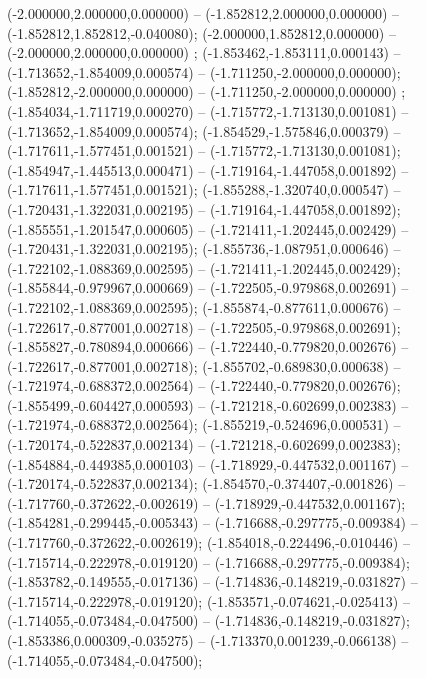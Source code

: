  (-2.000000,2.000000,0.000000) -- (-1.852812,2.000000,0.000000) -- (-1.852812,1.852812,-0.040080);
 (-2.000000,1.852812,0.000000) -- (-2.000000,2.000000,0.000000) ;
 (-1.853462,-1.853111,0.000143) -- (-1.713652,-1.854009,0.000574) -- (-1.711250,-2.000000,0.000000);
 (-1.852812,-2.000000,0.000000) -- (-1.711250,-2.000000,0.000000) ;
 (-1.854034,-1.711719,0.000270) -- (-1.715772,-1.713130,0.001081) -- (-1.713652,-1.854009,0.000574);
 (-1.854529,-1.575846,0.000379) -- (-1.717611,-1.577451,0.001521) -- (-1.715772,-1.713130,0.001081);
 (-1.854947,-1.445513,0.000471) -- (-1.719164,-1.447058,0.001892) -- (-1.717611,-1.577451,0.001521);
 (-1.855288,-1.320740,0.000547) -- (-1.720431,-1.322031,0.002195) -- (-1.719164,-1.447058,0.001892);
 (-1.855551,-1.201547,0.000605) -- (-1.721411,-1.202445,0.002429) -- (-1.720431,-1.322031,0.002195);
 (-1.855736,-1.087951,0.000646) -- (-1.722102,-1.088369,0.002595) -- (-1.721411,-1.202445,0.002429);
 (-1.855844,-0.979967,0.000669) -- (-1.722505,-0.979868,0.002691) -- (-1.722102,-1.088369,0.002595);
 (-1.855874,-0.877611,0.000676) -- (-1.722617,-0.877001,0.002718) -- (-1.722505,-0.979868,0.002691);
 (-1.855827,-0.780894,0.000666) -- (-1.722440,-0.779820,0.002676) -- (-1.722617,-0.877001,0.002718);
 (-1.855702,-0.689830,0.000638) -- (-1.721974,-0.688372,0.002564) -- (-1.722440,-0.779820,0.002676);
 (-1.855499,-0.604427,0.000593) -- (-1.721218,-0.602699,0.002383) -- (-1.721974,-0.688372,0.002564);
 (-1.855219,-0.524696,0.000531) -- (-1.720174,-0.522837,0.002134) -- (-1.721218,-0.602699,0.002383);
 (-1.854884,-0.449385,0.000103) -- (-1.718929,-0.447532,0.001167) -- (-1.720174,-0.522837,0.002134);
 (-1.854570,-0.374407,-0.001826) -- (-1.717760,-0.372622,-0.002619) -- (-1.718929,-0.447532,0.001167);
 (-1.854281,-0.299445,-0.005343) -- (-1.716688,-0.297775,-0.009384) -- (-1.717760,-0.372622,-0.002619);
 (-1.854018,-0.224496,-0.010446) -- (-1.715714,-0.222978,-0.019120) -- (-1.716688,-0.297775,-0.009384);
 (-1.853782,-0.149555,-0.017136) -- (-1.714836,-0.148219,-0.031827) -- (-1.715714,-0.222978,-0.019120);
 (-1.853571,-0.074621,-0.025413) -- (-1.714055,-0.073484,-0.047500) -- (-1.714836,-0.148219,-0.031827);
 (-1.853386,0.000309,-0.035275) -- (-1.713370,0.001239,-0.066138) -- (-1.714055,-0.073484,-0.047500);
